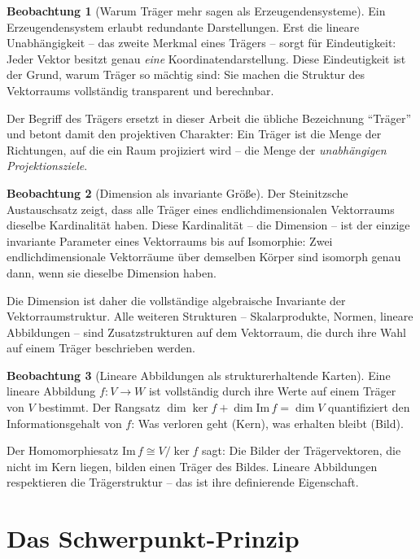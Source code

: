 ﻿\documentclass[a4paper,12pt]{report}
\theoremstyle{definition}
\newtheorem{beobachtung}{Beobachtung}
\begin{document}
\begin{beobachtung}[Warum Träger mehr sagen als Erzeugendensysteme]
    Ein Erzeugendensystem erlaubt redundante Darstellungen. Erst die
    lineare Unabhängigkeit -- das zweite Merkmal eines Trägers -- sorgt
    für Eindeutigkeit: Jeder Vektor besitzt genau \emph{eine}
    Koordinatendarstellung. Diese Eindeutigkeit ist der Grund, warum
    Träger so mächtig sind: Sie machen die Struktur des Vektorraums
    vollständig transparent und berechnbar.

    Der Begriff des Trägers ersetzt in dieser Arbeit die übliche
    Bezeichnung ``Träger'' und betont damit den projektiven Charakter:
    Ein Träger ist die Menge der Richtungen, auf die ein Raum projiziert
    wird -- die Menge der \emph{unabhängigen Projektionsziele}.
\end{beobachtung}

\begin{beobachtung}[Dimension als invariante Größe]
    Der Steinitzsche Austauschsatz zeigt, dass alle Träger eines
    endlichdimensionalen Vektorraums dieselbe Kardinalität haben.
    Diese Kardinalität -- die Dimension -- ist der einzige invariante
    Parameter eines Vektorraums bis auf Isomorphie:
    Zwei endlichdimensionale Vektorräume über demselben Körper sind
    isomorph genau dann, wenn sie dieselbe Dimension haben.

    Die Dimension ist daher die vollständige algebraische Invariante
    der Vektorraumstruktur. Alle weiteren Strukturen -- Skalarprodukte,
    Normen, lineare Abbildungen -- sind Zusatzstrukturen auf dem
    Vektorraum, die durch ihre Wahl auf einem Träger beschrieben werden.
\end{beobachtung}

\begin{beobachtung}[Lineare Abbildungen als strukturerhaltende Karten]
    Eine lineare Abbildung $f : V \to W$ ist vollständig durch ihre
    Werte auf einem Träger von $V$ bestimmt. Der Rangsatz
    $\dim\ker f + \dim\mathrm{Im}\,f = \dim V$ quantifiziert den
    Informationsgehalt von $f$: Was verloren geht (Kern), was
    erhalten bleibt (Bild).

    Der Homomorphiesatz $\mathrm{Im}\,f \cong V/\ker f$ sagt:
    Die Bilder der Trägervektoren, die nicht im Kern liegen, bilden
    einen Träger des Bildes. Lineare Abbildungen respektieren die
    Trägerstruktur -- das ist ihre definierende Eigenschaft.
\end{beobachtung}

\chapter{Das Schwerpunkt-Prinzip}
\end{document}
